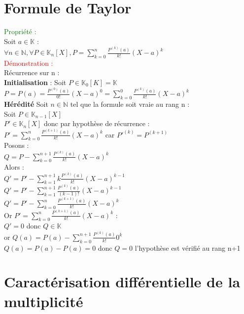 \documentclass{article}
\begin{document}
\section{Formule de Taylor}
\textcolor{green}{Propriété :} \\
Soit $a \in \mathbb K$ : \\
$\forall n \in \mathbb N, \forall P \in \mathbb K_n[X],P= \sum_{k=0}^n \frac{P^{(k)}(a)}{k!}(X-a)^k$  \\
\textcolor{red}{Démonstration :} \\
Récurrence sur n : \\
{\bf Initialisation} : Soit $P \in \mathbb K_0 [K]=\mathbb K$ \\
$P=P(a)=\frac{P^{(0)}(a)}{0!}(X-a)^0= \sum_{k=0}^0\frac{P^{(k)}(a)}{k!}(X-a)^k $ \\
{\bf Hérédité} Soit $n \in \mathbb N$ tel que la formule soit vraie au rang n  : \\
Soit $P \in \mathbb K_{n-1}[X]$ \\
$P' \in \mathbb K_n[X]$ donc par hypothèse de récurrence : \\
$P'=\sum_{k=0}^n \frac{P^{(k+1)}(a)}{k!}(X-a)^k$ car $P'^{(k)}=P^{(k+1)}$ \\
Posons : \\
$Q=P- \sum_{k=0}^{n+1}\frac{P^{(k)}(a)}{k!}(X-a)^k$ \\
Alors : \\
$Q'=P'-\sum_{k=1}^{n+1} k\frac{P^{(k)}(a)}{k!}(X-a)^{k-1} $ \\
$Q'=P'-\sum_{k=1}^{n+1} \frac{P^{(k)}(a)}{(k-1)!}(X-a)^{k-1} $ \\
$Q'=P'- \sum_{k=0}^n \frac{P^{(k+1)}(a)}{k!}(X-a)^k$ \\
Or $P'=\sum_{k=0}^n \frac{P^{(k+1)}(a)}{k!}(X-a)^k$ : \\
$Q'=0$ donc $Q \in \mathbb K$ \\
or $Q(a)= P(a)-\sum_{k=0}^{n+1} \frac{P^{(k)}(a)}{k!}0^k$ \\
$Q(a)=P(a)-P(a)=0$ donc $Q=0$ l'hypothèse est vérifié au rang n+1
\section{Caractérisation différentielle de la multiplicité}
\end{document}
